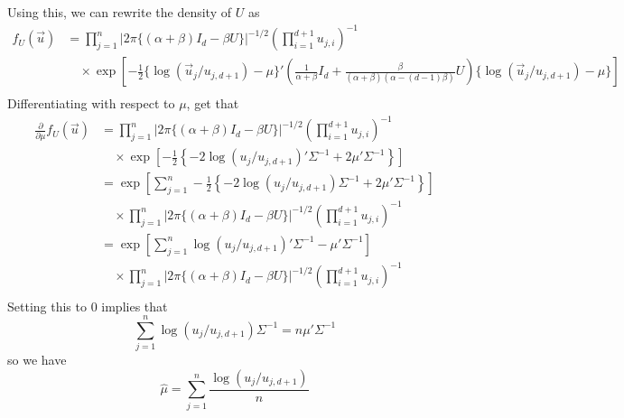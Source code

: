 \documentclass[letterpaper,10pt]{amsart}
\begin{document}
\begin{enumerate}[(1)]
Using this, we can rewrite the density of $U$ as 
\begin{align*}
f_U(\vec{u}) &= \prod_{j=1}^n |2 \pi \{(\alpha + \beta) I_d - \beta U\}|^{-1/2} \left(\prod_{i=1}^{d+1}u_{j,i}\right)^{-1} \\
& \quad \times \exp\left[-\frac{1}{2}\{\log(\vec{u}_j/u_{j,d+1}) - \mu\}' \left(\frac{1}{\alpha + \beta}I_d + \frac{\beta}{(\alpha + \beta)(\alpha - (d-1) \beta)}U\right)\{\log(\vec{u}_j/u_{j,d+1}) - \mu\}\right] \\
\end{align*}
Differentiating with respect to $\mu$, get that
\begin{align*}
\frac{\partial}{\partial \mu}f_U(\vec{u}) &= \prod_{j=1}^n |2 \pi \{(\alpha + \beta) I_d - \beta U\}|^{-1/2} \left(\prod_{i=1}^{d+1}u_{j,i} \right)^{-1} \\
&\quad \times \exp\left[-\frac{1}{2}\left\{-2 \log(u_j/u_{j,d+1})' \Sigma^{-1} + 2 \mu' \Sigma^{-1}\right\}\right]\\
&= \exp\left[\sum_{j=1}^n -\frac{1}{2}\left\{-2 \log(u_j/u_{j,d+1}) \Sigma^{-1} + 2 \mu' \Sigma^{-1}\right\}\right]\\
&\quad \times \prod_{j=1}^n |2 \pi \{(\alpha + \beta) I_d - \beta U\}|^{-1/2} \left(\prod_{i=1}^{d+1}u_{j,i} \right)^{-1} \\
&= \exp\left[\sum_{j=1}^n  \log(u_j/u_{j,d+1})' \Sigma^{-1} -  \mu' \Sigma^{-1}\right]\\
&\quad \times \prod_{j=1}^n |2 \pi \{(\alpha + \beta) I_d - \beta U\}|^{-1/2} \left(\prod_{i=1}^{d+1}u_{j,i} \right)^{-1} \\
\end{align*}
Setting this to 0 implies that
\[\sum_{j=1}^n \log(u_j/u_{j,d+1}) \Sigma^{-1} = n\mu' \Sigma^{-1}\]
so we have
\[\hat{\mu} = \sum_{j=1}^n\frac{\log(u_j/u_{j, d+1})}{n}\]

\bigskip


\end{enumerate}
\end{document}
